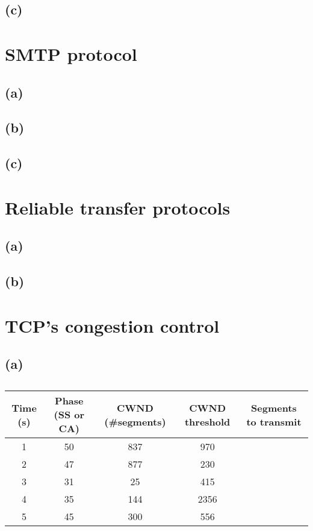 \documentclass[12pt, a4paper]{article}
\begin{document}
\subsection*{(c)}

\section{SMTP protocol}

\subsection*{(a)}

\subsection*{(b)}

\subsection*{(c)}

\section{Reliable transfer protocols}

\subsection*{(a)}

\subsection*{(b)}

\section{TCP’s congestion control}

\subsection*{(a)}
\begin{table}[ht]
\caption{ }
\centering
\begin{tabular}{c c c c c}
\hline\hline
Time (s) & Phase (SS or CA) & CWND (\#segments) & CWND threshold & Segments to transmit \\ [0.5ex] %
\hline
1 & 50 &  837& 970 \\  [1ex]
2 & 47 &  877& 230 \\ [1ex]
3 & 31 &   25 & 415 \\  [1ex]
4 & 35 & 144 & 2356 \\  [1ex]
5 & 45 & 300 & 556 \\  [1ex]
\hline
\end{tabular}
\label{table:nonlin}
\end{table}
\end{document}
